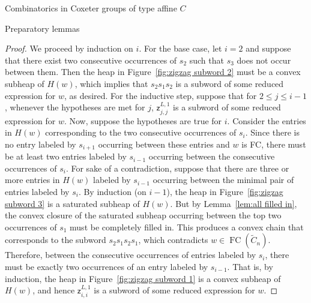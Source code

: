 \documentclass[11pt]{amsart}
\theoremstyle{definition}
\numberwithin{equation}{section}
\newcommand{\C}{\widetilde{C}}
\newcommand{\z}{\mathsf{z}}
\renewcommand{\(}{\left(}
\renewcommand{\)}{\right)}
\DeclareMathOperator{\FC}{FC}
\begin{document}
\begin{section}{Combinatorics in Coxeter groups of type affine $C$}
\begin{subsection}{Preparatory lemmas}
\begin{proof}
We proceed by induction on $i$.  For the base case, let $i=2$ and suppose that there exist two consecutive occurrences of $s_{2}$ such that $s_{3}$ does not occur between them.  Then the heap in Figure~\ref{fig:zigzag subword 2} must be a convex subheap of $H(w)$, which implies that $s_{2}s_{1}s_{2}$ is a subword of some reduced expression for $w$, as desired.  For the inductive step, suppose that for $2\leq j \leq i-1$, whenever the hypotheses are met for $j$, $\z_{j,j}^{L,1}$ is a subword of some reduced expression for $w$.  Now, suppose the hypotheses are true for $i$.  Consider the entries in $H(w)$ corresponding to the two consecutive occurrences of $s_{i}$.  Since there is no entry labeled by $s_{i+1}$ occurring between these entries and $w$ is FC, there must be at least two entries labeled by $s_{i-1}$ occurring between the consecutive occurrences of $s_{i}$.  For sake of a contradiction, suppose  that there are three or more entries in $H(w)$ labeled by $s_{i-1}$ occurring between the minimal pair of entries labeled by $s_{i}$.  By induction (on $i-1$), the heap in Figure~\ref{fig:zigzag subword 3} is a saturated subheap of $H(w)$.  But by Lemma~\ref{lem:all filled in}, the convex closure of the saturated subheap occurring between the top two occurrences of $s_{1}$ must be completely filled in.  This produces a convex chain that corresponds to the subword $s_{2}s_{1}s_{2}s_{1}$, which contradicts $w \in \FC(\C_{n})$.  Therefore, between the consecutive occurrences of entries labeled by $s_{i}$, there must be exactly two occurrences of an entry labeled by $s_{i-1}$.  That is, by induction, the heap in Figure~\ref{fig:zigzag subword 1} is a convex subheap of $H(w)$, and hence $\z_{i,i}^{L,1}$ is a subword of some reduced expression for $w$.
\end{proof}


\end{subsection}
\end{section}
\end{document}
